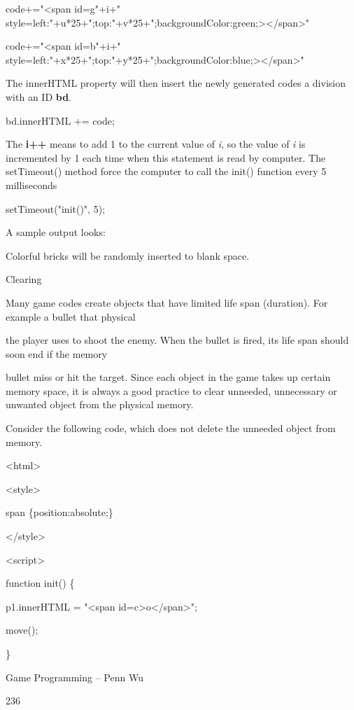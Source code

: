 \documentclass[
]{article}
\begin{document}
code+="\textless span id=g"+i+"
style=\textquotesingle left:"+u*25+";top:"+v*25+";backgroundColor:green;\textquotesingle\textgreater\textless/span\textgreater"

code+="\textless span id=b"+i+"
style=\textquotesingle left:"+x*25+";top:"+y*25+";backgroundColor:blue;\textquotesingle\textgreater\textless/span\textgreater"

The innerHTML property will then insert the newly generated codes a
division with an ID \textbf{bd}.

bd.innerHTML += code;

The \textbf{i++} means to add 1 to the current value of \emph{i}, so the
value of \emph{i} is incremented by 1 each time when this statement is
read by computer. The setTimeout() method force the computer to call the
init() function every 5 milliseconds

setTimeout("init()", 5);

A sample output looks:

Colorful bricks will be randomly inserted to blank space.

Clearing

Many game codes create objects that have limited life span (duration).
For example a bullet that physical

the player uses to shoot the enemy. When the bullet is fired, its life
span should soon end if the memory

bullet miss or hit the target. Since each object in the game takes up
certain memory space, it is always a good practice to clear unneeded,
unnecessary or unwanted object from the physical memory.

Consider the following code, which does not delete the unneeded object
from memory.

\textless html\textgreater{}

\textless style\textgreater{}

span \{position:absolute;\}

\textless/style\textgreater{}

\textless script\textgreater{}

function init() \{

p1.innerHTML = "\textless span
id=\textquotesingle c\textquotesingle\textgreater o\textless/span\textgreater";

move();

\}

Game Programming -- Penn Wu

236
\end{document}
